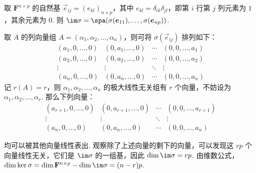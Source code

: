 \begin{enumerate}
          取 $ \mathbf{F}^{n \times p} $ 的自然基 $ \vec{e}_{ij} = (e_{kl})_{n \times p} $，其中 $ e_{kl} = \delta_{ik} \delta_{jl} $，即第 $ i $ 行第 $ j $ 列元素为 $ 1 $，其余元素为 $ 0 $. 则 $ \im \sigma = \spa(\sigma(\vec{e}_{11}), \ldots, \sigma(\vec{e}_{np})) $.

          取 $ A $ 的列向量组 $ A = (\alpha_1, \alpha_2, \ldots, \alpha_n) $，则可将 $ \sigma(\vec{e}_{ij}) $ 排列如下：
          \[ \begin{matrix}
                  (a_1, 0, \ldots, 0) & (0, a_1, \ldots, 0) & \cdots & (0, 0, \ldots, a_1) \\
                  (a_2, 0, \ldots, 0) & (0, a_2, \ldots, 0) & \cdots & (0, 0, \ldots, a_2) \\
                  \vdots              & \vdots              & \ddots & \vdots              \\
                  (a_n, 0, \ldots, 0) & (0, a_n, \ldots, 0) & \cdots & (0, 0, \ldots, a_n)
              \end{matrix} \]
          记 $ r(A) = r $，则 $ \alpha_1, \alpha_2, \ldots, \alpha_n $ 的极大线性无关组有 $ r $ 个向量，不妨设为 $ \alpha_1, \alpha_2, \ldots, \alpha_r $. 那么下列向量：
          \[ \begin{matrix}
                  (a_{r+1}, 0, \ldots, 0) & (0, a_{r+1}, \ldots, 0) & \cdots & (0, 0, \ldots, a_{r+1}) \\
                  \vdots                  & \vdots                  & \ddots & \vdots                  \\
                  (a_n, 0, \ldots, 0)     & (0, a_n, \ldots, 0)     & \cdots & (0, 0, \ldots, a_n)
              \end{matrix} \]

          均可以被其他向量线性表出. 观察除了上述向量的剩下的向量，可以发现这 $ rp $ 个向量线性无关，它们是 $ \im \sigma $ 的一组基，因此 $ \dim \im \sigma = rp $. 由维数公式，$ \dim \ker \sigma = \dim \mathbf{F}^{n \times p} - \dim \im \sigma = (n - r)p $.
\end{enumerate}

\clearpage
